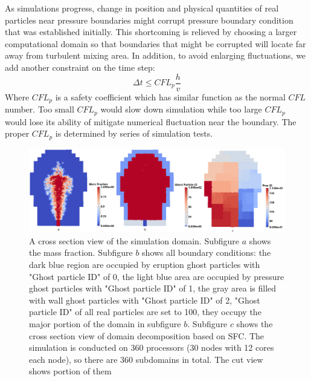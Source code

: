 \documentclass[journal abbreviation, manuscript]{copernicus}
\begin{document}
As simulations progress, change in position and physical quantities of real particles near pressure boundaries might corrupt pressure boundary condition that was established initially. This shortcoming is relieved by choosing a larger computational domain so that boundaries that might be corrupted will locate far away from turbulent mixing area. In addition, to avoid enlarging fluctuations, we add another constraint on the time step: 
\begin{equation}
\Delta t \leq CFL_p \dfrac{h}{v}
\end{equation}
Where $CFL_p$ is a safety coefficient which has similar function as the normal $CFL$ number. Too small $CFL_p$ would slow down simulation while too large $CFL_p$ would lose its ability of mitigate numerical fluctuation near the boundary. The proper $CFL_p$ is determined by series of simulation tests.

\begin{figure}
\includegraphics[width=18cm]{t120_bc_proc.png}
\caption{A cross section view of the simulation domain. Subfigure $a$ shows the mass fraction. Subfigure $b$ shows all boundary conditions: the dark blue region are occupied by eruption ghost particles with "Ghost particle ID" of 0, the light blue area are occupied by pressure ghost particles with "Ghost particle ID" of 1, the gray area is filled with wall ghost particles with "Ghost particle ID" of 2, "Ghost particle ID" of all real particles are set to 100, they occupy the major portion of the domain in subfigure $b$. Subfigure $c$ shows the cross section view of domain decomposition based on SFC. The simulation is conducted on 360 processors (30 nodes with 12 cores each node), so there are 360 subdomains in total. The cut view shows portion of them}
\label{fig:bc_and_domain_decomp}
\end{figure}
\end{document}

